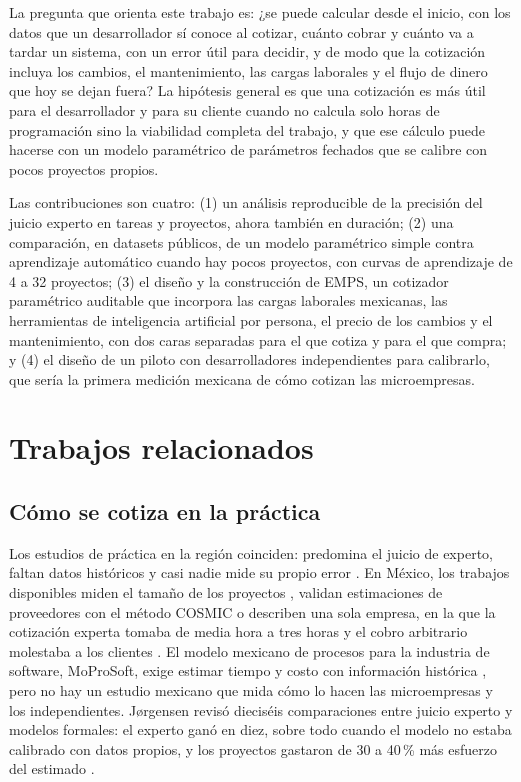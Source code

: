 \documentclass[10pt,twocolumn]{article}
\begin{document}
La pregunta que orienta este trabajo es: ¿se puede calcular desde el inicio, con los datos que un desarrollador sí conoce al cotizar, cuánto cobrar y cuánto va a tardar un sistema, con un error útil para decidir, y de modo que la cotización incluya los cambios, el mantenimiento, las cargas laborales y el flujo de dinero que hoy se dejan fuera? La hipótesis general es que una cotización es más útil para el desarrollador y para su cliente cuando no calcula solo horas de programación sino la viabilidad completa del trabajo, y que ese cálculo puede hacerse con un modelo paramétrico de parámetros fechados que se calibre con pocos proyectos propios.

Las contribuciones son cuatro: (1) un análisis reproducible de la precisión del juicio experto en \nJosseExp{} tareas y \nSeera{} proyectos, ahora también en duración; (2) una comparación, en \nuevoNconjuntos{} datasets públicos, de un modelo paramétrico simple contra aprendizaje automático cuando hay pocos proyectos, con curvas de aprendizaje de 4 a 32 proyectos; (3) el diseño y la construcción de EMPS, un cotizador paramétrico auditable que incorpora las cargas laborales mexicanas, las herramientas de inteligencia artificial por persona, el precio de los cambios y el mantenimiento, con dos caras separadas para el que cotiza y para el que compra; y (4) el diseño de un piloto con desarrolladores independientes para calibrarlo, que sería la primera medición mexicana de cómo cotizan las microempresas.

\section{Trabajos relacionados}
\subsection{Cómo se cotiza en la práctica}
Los estudios de práctica en la región coinciden: predomina el juicio de experto, faltan datos históricos y casi nadie mide su propio error \cite{cardozo2022diagnostico,vera2018understanding,tortosa2025effort,prietobustamante2020estimacion}. En México, los trabajos disponibles miden el tamaño de los proyectos \cite{aguilar2014size}, validan estimaciones de proveedores con el método COSMIC \cite{valdessouto2019validation,valdessouto2024merging} o describen una sola empresa, en la que la cotización experta tomaba de media hora a tres horas y el cobro arbitrario molestaba a los clientes \cite{bonilla2017diseno}. El modelo mexicano de procesos para la industria de software, MoProSoft, exige estimar tiempo y costo con información histórica \cite{oktaba2005modelo}, pero no hay un estudio mexicano que mida cómo lo hacen las microempresas y los independientes. Jørgensen revisó dieciséis comparaciones entre juicio experto y modelos formales: el experto ganó en diez, sobre todo cuando el modelo no estaba calibrado con datos propios, y los proyectos gastaron de 30 a 40\,\% más esfuerzo del estimado \cite{jrgensen2007forecasting}.
\end{document}
